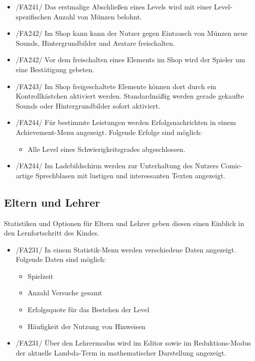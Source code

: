 \begin{itemize}
\item /FA241/ Das erstmalige Abschließen eines Levels wird mit einer Level-spezifischen Anzahl von Münzen belohnt.
\item /FA242/ Im Shop kann kann der Nutzer gegen Eintausch von Münzen neue Sounds, Hintergrundbilder und Avatare freischalten.
\item /FA242/ Vor dem freischalten eines Elements im Shop wird der Spieler um eine Bestätigung gebeten.
\item /FA243/ Im Shop freigeschaltete Elemente können dort durch ein Kontrollkästchen aktiviert werden. Standardmäßig werden gerade gekaufte Sounds oder Hintergrundbilder sofort aktiviert.
\item /FA244/ Für bestimmte Leistungen werden Erfolgsnachrichten in einem Achievement-Menu angezeigt. Folgende Erfolge sind möglich:
\begin{itemize}
\item Alle Level eines Schwierigkeitsgrades abgeschlossen.
\end{itemize}
\item /FA244/ Im Ladebildschirm werden zur Unterhaltung des Nutzers Comic-artige Sprechblasen mit lustigen und interessanten Texten angezeigt.
\end{itemize}

\subsection{Eltern und Lehrer}

Statistiken und Optionen für Eltern und Lehrer geben diesen einen Einblick in den Lernfortschritt des Kindes.

\begin{itemize}
\item /FA231/ In einem Statistik-Menu werden verschiedene Daten angezeigt. Folgende Daten sind möglich:
\begin{itemize}
\item Spielzeit
\item Anzahl Versuche gesamt
\item Erfolgsquote für das Bestehen der Level
\item Häufigkeit der Nutzung von Hinweisen
\end{itemize}
\item /FA231/ Über den Lehrermodus wird im Editor sowie im Reduktions-Modus der aktuelle Lambda-Term in mathematischer Darstellung angezeigt.
\end{itemize}

